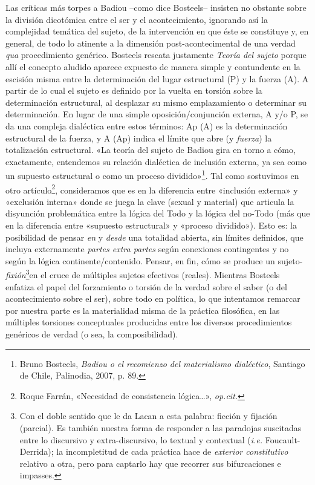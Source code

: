 Las críticas más torpes a Badiou --como dice Bosteels-- insisten no obstante sobre la división dicotómica entre el ser y el acontecimiento, ignorando así la complejidad temática del sujeto, de la intervención en que éste se constituye y, en general, de todo lo atinente a la dimensión post-acontecimental de una verdad \emph{qua} procedimiento genérico. Bosteels rescata justamente \emph{Teoría del sujeto} porque allí el concepto aludido aparece expuesto de manera simple y contundente en la escisión misma entre la determinación del lugar estructural (P) y la fuerza (A). A partir de lo cual el sujeto es definido por la vuelta en torsión sobre la determinación estructural, al desplazar su mismo emplazamiento o determinar su determinación. En lugar de una simple oposición/conjunción externa, A y/o P, se da una compleja dialéctica entre estos términos: Ap (A) es la determinación estructural de la fuerza, y A (Ap) indica el límite que abre (y \emph{fuerza}) la totalización estructural. «La teoría del sujeto de Badiou gira en torno a cómo, exactamente, entendemos su relación dialéctica de inclusión externa, ya sea como un supuesto estructural o como un proceso dividido»\footnote{Bruno Bosteels, \emph{Badiou o el recomienzo del materialismo dialéctico}, Santiago de Chile, Palinodia, 2007, p. 89.}. Tal como sostuvimos en otro artículo\footnote{Roque Farrán, «Necesidad de consistencia lógica\ldots», \emph{op.cit.}}, consideramos que es en la diferencia entre «inclusión externa» y «exclusión interna» donde se juega la clave (sexual y material) que articula la disyunción problemática entre la lógica del Todo y la lógica del no-Todo (más que en la diferencia entre «supuesto estructural» y «proceso dividido»). Esto es: la posibilidad de pensar \emph{en} y \emph{desde} una totalidad abierta, sin límites definidos, que incluya externamente \emph{partes extra partes} según conexiones contingentes y no según la lógica continente/contenido. Pensar, en fin, cómo se produce un sujeto-\emph{fixión}\footnote{Con el doble sentido que le da Lacan a esta palabra: ficción y fijación (parcial). Es también nuestra forma de responder a las paradojas suscitadas entre lo discursivo y extra-discursivo, lo textual y contextual (\emph{i.e.} Foucault-Derrida); la incompletitud de cada práctica hace de \emph{exterior constitutivo} relativo a otra, pero para captarlo hay que recorrer sus bifurcaciones e impasses.}en el cruce de múltiples sujetos efectivos (reales). Mientras Bosteels enfatiza el papel del forzamiento o torsión de la verdad sobre el saber (o del acontecimiento sobre el ser), sobre todo en política, lo que intentamos remarcar por nuestra parte es la materialidad misma de la práctica filosófica, en las múltiples torsiones conceptuales producidas entre los diversos procedimientos genéricos de verdad (o sea, la composibilidad).


